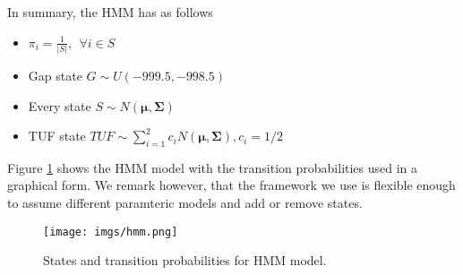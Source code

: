 




In summary, the HMM has as follows

\begin{itemize}
	\item $\pi_i = \frac{1}{|S|}, ~~ \forall i \in S$
	\item Gap state $G\sim U(-999.5, -998.5)$
	\item Every state $S \sim N(\boldsymbol{\mu}, \boldsymbol{\Sigma})$  
	\item TUF state $TUF \sim \sum_{i=1}^{2} c_i N(\boldsymbol{\mu}, \boldsymbol{\Sigma}), c_i = 1/2$
\end{itemize}
Figure \ref{hmm_figure}
shows the HMM model with the transition probabilities used in a graphical form.
We remark however, that the framework we use is flexible enough to assume different paramteric models and add or remove states.

\begin{figure}[!htb]
	\begin{center}
		\texttt{[image: imgs/hmm.png]}
	\end{center}
	\caption{States and transition probabilities for HMM model.}
	\label{hmm_figure}
\end{figure} 

